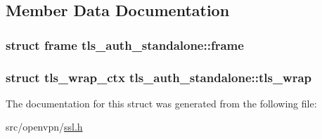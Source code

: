 \subsection{Member Data Documentation}
\hypertarget{structtls__auth__standalone_a72cf30b064c14558ff2e61212cc0c33c}{}
\subsubsection[{frame}]{\setlength{\rightskip}{0pt plus 5cm}struct {\bf frame} tls\+\_\+auth\+\_\+standalone\+::frame}\label{structtls__auth__standalone_a72cf30b064c14558ff2e61212cc0c33c}
\hypertarget{structtls__auth__standalone_af260bc1e93fde8eb3368cbd78de45f38}{}
\subsubsection[{tls\+\_\+wrap}]{\setlength{\rightskip}{0pt plus 5cm}struct {\bf tls\+\_\+wrap\+\_\+ctx} tls\+\_\+auth\+\_\+standalone\+::tls\+\_\+wrap}\label{structtls__auth__standalone_af260bc1e93fde8eb3368cbd78de45f38}


The documentation for this struct was generated from the following file\+:\begin{DoxyCompactItemize}
\item 
src/openvpn/\hyperlink{ssl_8h}{ssl.\+h}\end{DoxyCompactItemize}
